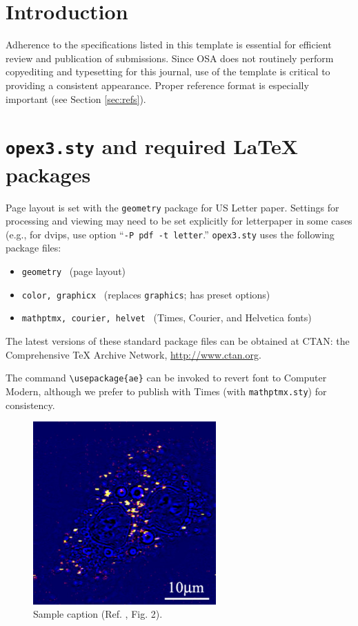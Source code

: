 \documentclass[10pt,letterpaper]{article}
\begin{document}
\section{Introduction}
Adherence to the specifications listed in this template is essential for efficient review and publication of submissions. Since OSA does not routinely perform copyediting and typesetting for this journal, use of the template is critical to providing a consistent appearance. Proper reference format is especially important (see Section \ref{sec:refs}).

\section{\texttt{opex3.sty} and required \LaTeX{} packages}
Page layout is set with the \texttt{geometry} package for US Letter paper. Settings for processing and viewing may need to be set explicitly for letterpaper in some cases (e.g., for dvips, use option ``\texttt{-P pdf -t letter}.'' \texttt{opex3.sty} uses the following package files:

\begin{itemize}
\item \texttt{geometry} \ (page layout)
\item \texttt{color, graphicx} \ (replaces \texttt{graphics}; has preset options)
\item \texttt{mathptmx, courier, helvet} \ (Times, Courier, and Helvetica fonts) 
\end{itemize}

The latest versions of these standard package files can be obtained at CTAN: the Comprehensive TeX Archive Network, \url{http://www.ctan.org}.

\bigskip

\noindent The command \verb+\usepackage{ae}+ can be invoked to revert font to Computer Modern, although we prefer to publish with Times (with \texttt{mathptmx.sty}) for consistency.

\begin{figure}[htb]
\centering\includegraphics[width=7cm]{opexfig1}
\caption{Sample caption (Ref. \cite{Oron03}, Fig. 2).}
\end{figure}
\end{document}

